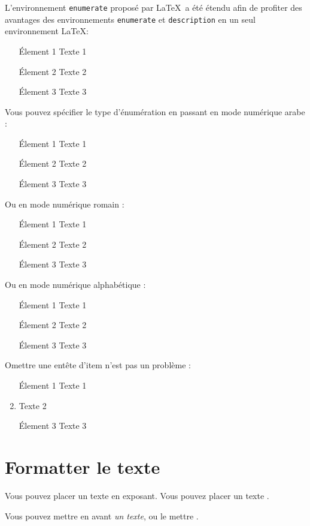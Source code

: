 \documentclass[french]{spimubphdthesis}
\begin{document}
L'environnement \texttt{enumerate} proposé par \LaTeX\ a été étendu afin de profiter des avantages des environnements \texttt{enumerate} et \texttt{description} en un seul environnement \LaTeX:
\begin{enumerate}
\item[\'Element 1] Texte 1
\item[\'Element 2] Texte 2
\item[\'Element 3] Texte 3
\end{enumerate}

Vous pouvez spécifier le type d'énumération en passant en mode numérique arabe :
\begin{enumerate}[1]
\item[\'Element 1] Texte 1
\item[\'Element 2] Texte 2
\item[\'Element 3] Texte 3
\end{enumerate}

Ou en mode numérique romain :
\begin{enumerate}[i]
\item[\'Element 1] Texte 1
\item[\'Element 2] Texte 2
\item[\'Element 3] Texte 3
\end{enumerate}

Ou en mode numérique alphabétique :
\begin{enumerate}[a]
\item[\'Element 1] Texte 1
\item[\'Element 2] Texte 2
\item[\'Element 3] Texte 3
\end{enumerate}

Omettre une entête d'item n'est pas un problème :
\begin{enumerate}
\item[\'Element 1] Texte 1
\item Texte 2
\item[\'Element 3] Texte 3
\end{enumerate}

\section{Formatter le texte}

Vous pouvez placer un texte \textup{en exposant}. Vous pouvez placer un texte .

Vous pouvez mettre en avant \emph{un texte}, ou le mettre .
\end{document}
